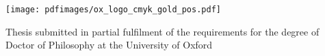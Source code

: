 \documentclass[dissertation]{subfiles}
\begin{document}
\begin{titlepage}

\begin{center}

\vspace*{36pt}

\newlength{\titlewordspace}
\setlength{\titlewordspace}{.7em}

\newlength{\titlecharspace}
\setlength{\titlecharspace}{1pt}


\vspace{36pt}



\vspace{\fill}
\vspace{\fill}

\texttt{[image: pdfimages/ox\_logo\_cmyk\_gold\_pos.pdf]}

\vspace{\fill}

Thesis submitted in partial fulfilment of the requirements for the degree of Doctor of Philosophy at the University of Oxford

\timestamp

\end{center}

\end{titlepage}
\end{document}
